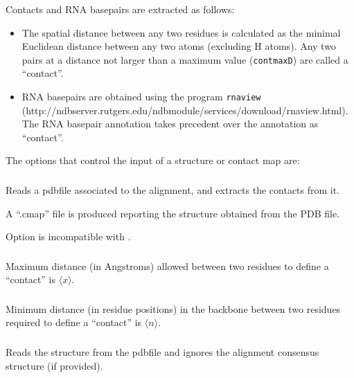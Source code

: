 Contacts and RNA basepairs are extracted as follows:
\begin{itemize}

\item The spatial distance between any two residues is calculated as the  minimal Euclidean distance between any two atoms (excluding
 H atoms). Any two pairs at a distance not larger than a maximum value
(\texttt{contmaxD}) are called a ``contact''.

\item RNA basepairs are obtained using the program \texttt{rnaview}~\citep{YangWesthof03}\\
(http://ndbserver.rutgers.edu/ndbmodule/services/download/rnaview.html).\\
The RNA basepair annotation takes precedent over the annotation as ``contact''.
\end{itemize}

\vspace{2mm}
\noindent
The options that control the input of a structure or contact map are:

\subsubsection{} Reads a pdbfile associated to the alignment, and extracts the contacts
from it.

A ``.cmap'' file is produced reporting the structure obtained from the PDB file.

Option  is incompatible with .

\subsubsection{} Maximum distance (in Angstroms) allowed between two residues to define a ``contact'' is $\langle x\rangle$.

\subsubsection{} Minimum distance (in residue positions) in the backbone between two residues required to define a ``contact'' is $\langle n\rangle$.
\vspace{5mm}

\subsubsection{} Reads the structure from the pdbfile and ignores the alignment consensus structure (if provided).

